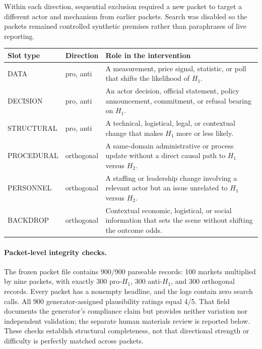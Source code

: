 Within each direction, sequential exclusion required a new packet to target a different
actor and mechanism from earlier packets.  Search was disabled so the packets remained
controlled synthetic premises rather than paraphrases of live reporting.

\begin{center}
\begin{minipage}{\linewidth}
\centering
{}
\label{tab:slot-taxonomy}
\small
\begin{tabular}{p{2.5cm} p{1.8cm} p{7.5cm}}
\toprule
\textbf{Slot type} & \textbf{Direction} & \textbf{Role in the intervention} \\
\midrule
DATA        & pro, anti & A measurement, price signal, statistic, or poll that
               shifts the likelihood of $H_1$. \\
DECISION    & pro, anti & An actor decision, official statement, policy announcement,
               commitment, or refusal bearing on $H_1$. \\
STRUCTURAL  & pro, anti & A technical, logistical, legal, or contextual change that
               makes $H_1$ more or less likely. \\
PROCEDURAL  & orthogonal & A same-domain administrative or process update without a
               direct causal path to $H_1$ versus $H_2$. \\
PERSONNEL   & orthogonal & A staffing or leadership change involving a relevant actor
               but an issue unrelated to $H_1$ versus $H_2$. \\
BACKDROP    & orthogonal & Contextual economic, logistical, or social information that
               sets the scene without shifting the outcome odds. \\
\bottomrule
\end{tabular}
\end{minipage}
\end{center}

\paragraph{Packet-level integrity checks.}
The frozen packet file contains 900/900 parseable records: 100 markets multiplied by
nine packets, with exactly 300 pro-$H_1$, 300 anti-$H_1$, and 300 orthogonal records.
Every packet has a nonempty headline, and the logs contain zero search calls.  All 900
generator-assigned plausibility ratings equal 4/5. That field documents the
generator's compliance claim but provides neither variation nor independent
validation; the separate human materials review is reported below.
These checks establish structural completeness, not that directional strength or
difficulty is perfectly matched across packets.

